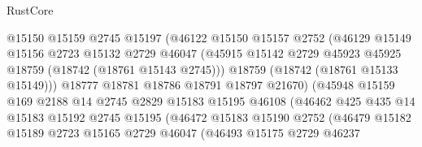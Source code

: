 \begin{lexlean}{RustCore}
\begin{coremodule}
                              @15150
                              @15159
                              @2745
                              @15197
                              (@46122
                                @15150
                                @15157
                                @2752
                                (@46129
                                  @15149
                                  @15156
                                  @2723
                                  @15132
                                  @2729
                                  @46047
                                  (@45915
                                    @15142
                                    @2729
                                    @45923
                                    @45925
                                    @18759
                                    (@18742 (@18761 @15143 @2745)))
                                  @18759
                                  (@18742 (@18761 @15133 @15149)))
                                @18777
                                @18781
                                @18786
                                @18791
                                @18797
                                @21670)
                              (@45948
                                @15159
                                @169
                                @2188
                                @14
                                @2745
                                @2829
                                @15183
                                @15195
                                @46108
                                (@46462
                                  @425
                                  @435
                                  @14
                                  @15183
                                  @15192
                                  @2745
                                  @15195
                                  (@46472
                                    @15183
                                    @15190
                                    @2752
                                    (@46479
                                      @15182
                                      @15189
                                      @2723
                                      @15165
                                      @2729
                                      @46047
                                      (@46493
                                        @15175
                                        @2729
                                        @46237

\end{coremodule}
\end{lexlean}

